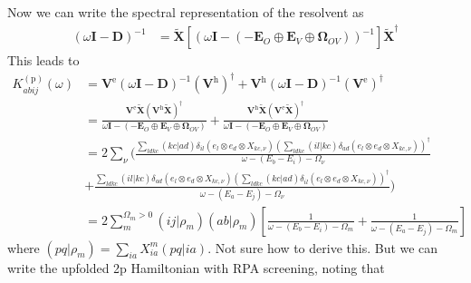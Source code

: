 Now we can write the spectral representation of the resolvent as
\begin{align}
(\omega \mathbf{I} - \bm{D})^{-1} &= \bm{\tilde{X}} \left[\left(\omega \mathbf{I} - \left(-\bm{E}_O \oplus \bm{E}_V \oplus \bm{\Omega}_{OV}\right)\right)^{-1}\right] \bm{\tilde{X}}^\dagger
\end{align}
This leads to
\begin{align}
K_{abij}^{(\mathrm{p})}(\omega) &= \mathbf{V}^{\mathrm{e}}(\omega \mathbf{I} - \mathbf{D})^{-1} (\mathbf{V}^{\mathrm{h}})^{\dagger} + \mathbf{V}^{\mathrm{h}}(\omega \mathbf{I} - \mathbf{D})^{-1} (\mathbf{V}^{\mathrm{e}})^{\dagger} \\
&= \frac{\mathbf{V}^{\mathrm{e}} \bm{\tilde{X}}  (\bm{V}^{\mathrm{h}}\bm{\tilde{X}})^{\dagger}}{\omega \mathbf{I} - \left(-\bm{E}_O \oplus \bm{E}_V \oplus \bm{\Omega }_{OV}\right)} + \frac{\bm{V}^{\mathrm{h}} \bm{\tilde{X}}  (\bm{V}^{\mathrm{e}}\bm{\tilde{X}})^{\dagger}}{\omega \mathbf{I} - \left(-\bm{E}_O \oplus \bm{E}_V \oplus \bm{\Omega }_{OV}\right)} \\
&= 2\sum_{\nu}(\frac{\sum_{ldkc}(kc|ad) \delta_{il} \left( e_l \otimes e_d \otimes X_{kc,\nu} \right) (\sum_{ldkc} (il|kc) \delta_{ad} \left( e_l \otimes e_d \otimes X_{kc,\nu} \right))^{\dagger}}{\omega - (E_b - E_i) - \Omega_{\nu}} \\
&+ \frac{\sum_{ldkc}(il|kc) \delta_{ad} \left( e_l \otimes e_d \otimes X_{kc,\nu} \right) (\sum_{ldkc} (kc|ad) \delta_{il} \left( e_l \otimes e_d \otimes X_{kc,\nu} \right))^{\dagger}}{\omega - (E_a - E_j) - \Omega_{\nu}} )\\
&= 2 \sum_m^{\Omega_m>0}\left(i j| \rho_m\right)\left(a b|\rho_m\right)\left[\frac{1}{\omega-\left(E_b-E_i\right)-\Omega_m}+\frac{1}{\omega-\left(E_a-E_j\right)-\Omega_m}\right]
\end{align}
where $\left(p q | \rho_m\right)=\sum_{i a} X_{i a}^m(p q | i a)$.
Not sure how to derive this. But we can write the upfolded 2p Hamiltonian with RPA screening, noting that
